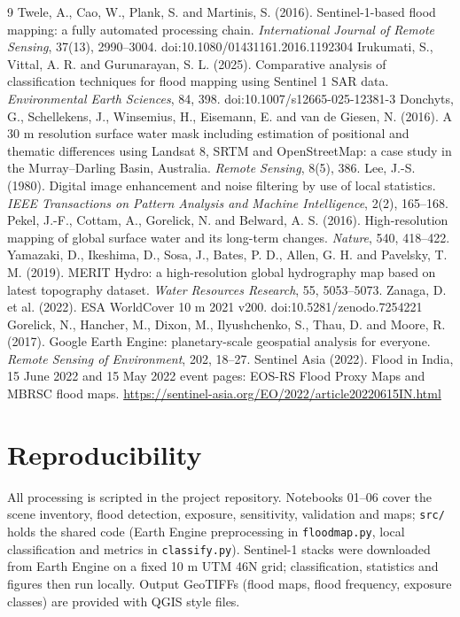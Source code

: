 \documentclass[11pt,a4paper]{article}
\begin{document}
\begin{thebibliography}{9}\small
{} Twele, A., Cao, W., Plank, S. and Martinis, S. (2016). Sentinel-1-based flood mapping: a fully automated
processing chain. \emph{International Journal of Remote Sensing}, 37(13), 2990--3004. doi:10.1080/01431161.2016.1192304
 Irukumati, S., Vittal, A. R. and Gurunarayan, S. L. (2025). Comparative analysis of classification
techniques for flood mapping using Sentinel 1 SAR data. \emph{Environmental Earth Sciences}, 84, 398.
doi:10.1007/s12665-025-12381-3
 Donchyts, G., Schellekens, J., Winsemius, H., Eisemann, E. and van de Giesen, N. (2016). A 30 m
resolution surface water mask including estimation of positional and thematic differences using Landsat 8, SRTM and
OpenStreetMap: a case study in the Murray--Darling Basin, Australia. \emph{Remote Sensing}, 8(5), 386.
 Lee, J.-S. (1980). Digital image enhancement and noise filtering by use of local statistics. \emph{IEEE
Transactions on Pattern Analysis and Machine Intelligence}, 2(2), 165--168.
 Pekel, J.-F., Cottam, A., Gorelick, N. and Belward, A. S. (2016). High-resolution mapping of global surface
water and its long-term changes. \emph{Nature}, 540, 418--422.
 Yamazaki, D., Ikeshima, D., Sosa, J., Bates, P. D., Allen, G. H. and Pavelsky, T. M. (2019). MERIT Hydro: a
high-resolution global hydrography map based on latest topography dataset. \emph{Water Resources Research}, 55, 5053--5073.
 Zanaga, D. et al. (2022). ESA WorldCover 10 m 2021 v200. doi:10.5281/zenodo.7254221
 Gorelick, N., Hancher, M., Dixon, M., Ilyushchenko, S., Thau, D. and Moore, R. (2017). Google Earth Engine:
planetary-scale geospatial analysis for everyone. \emph{Remote Sensing of Environment}, 202, 18--27.
 Sentinel Asia (2022). Flood in India, 15 June 2022 and 15 May 2022 event pages: EOS-RS Flood Proxy Maps and
MBRSC flood maps. \url{https://sentinel-asia.org/EO/2022/article20220615IN.html}
\end{thebibliography}

\appendix
\section{Reproducibility}
All processing is scripted in the project repository. Notebooks 01--06 cover the scene inventory, flood detection,
exposure, sensitivity, validation and maps; \texttt{src/} holds the shared code (Earth Engine preprocessing in
\texttt{floodmap.py}, local classification and metrics in \texttt{classify.py}). Sentinel-1 stacks were downloaded from
Earth Engine on a fixed 10 m UTM 46N grid; classification, statistics and figures then run locally. Output GeoTIFFs
(flood maps, flood frequency, exposure classes) are provided with QGIS style files.
\end{document}
